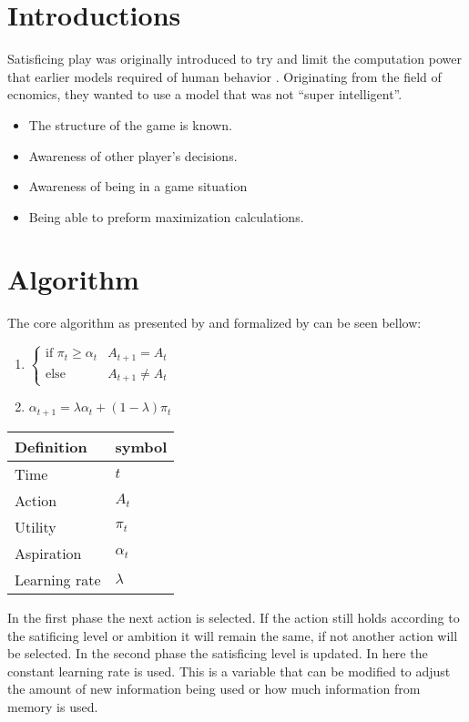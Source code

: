 
\section{Introductions}

Satisficing play was originally introduced
to try and limit the computation power that earlier models required of human
behavior \citep{herbert}. Originating from the field of ecnomics, they
wanted to use a model that was not ``super intelligent''.

\begin{itemize}
  \item The structure of the game is known.
  \item Awareness of other player's decisions.
  \item Awareness of being in a game situation
  \item Being able to preform maximization calculations.
\end{itemize}

\section{Algorithm}
The core algorithm as presented by \citep{herbert} and formalized by
\citep{karandikar}
can be seen bellow:

\begin{enumerate}
  \item $ \begin{cases}
              \text{if } \pi_t \geq \alpha_t & A_{t+1} = A_t\\
              \text{else} & A_{t+1} \neq A_t
              \end{cases}$
  \item $ \alpha_{t+1} = \lambda \alpha_t + (1-\lambda) \pi_t $ \\
\end{enumerate}
\begin{tabular}{ll}
  Definition & symbol \\ \toprule
  Time & $t$ \\
  Action & $A_t$ \\
  Utility & $\pi_t$ \\
  Aspiration & $\alpha_t$ \\
  Learning rate & $\lambda$ \\ \bottomrule
\end{tabular}

In the first phase the next action is selected. If the action still holds
according to the satificing level or ambition it will remain the same, if not another
action will be selected. In the second phase the satisficing level is updated.
In here the constant learning rate is used. This is a variable that can be
modified to adjust the amount of new information being used or how much
information from memory is used.


